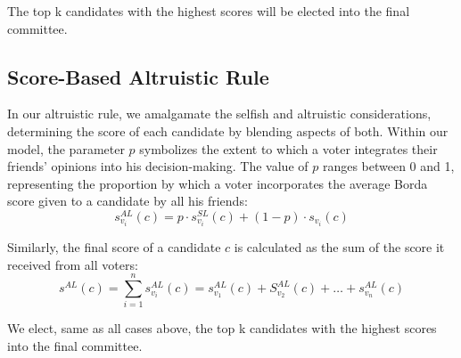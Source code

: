 \documentclass{article}
\begin{document}
The top k candidates with the highest scores will be elected into the final committee.

\subsection{Score-Based Altruistic Rule}
In our altruistic rule, we amalgamate the selfish and altruistic considerations, determining the score of each candidate by blending aspects of both. Within our model, the parameter $p$ symbolizes the extent to which a voter integrates their friends' opinions into his decision-making. The value of $p$ ranges between 0 and 1, representing the proportion by which a voter incorporates the average Borda score given to a candidate by all his friends:
\begin{equation}
s_{v_i}^{AL}(c) = p \cdot s_{v_i}^{SL}(c) + (1-p) \cdot s_{v_i}(c)\label{SB:EQ_singlevoter_Score}
\end{equation}



Similarly, the final score of a candidate $c$ is calculated as the sum of the score it received from all voters:
\begin{equation}
s^{AL}(c) = \sum_{i=1}^{n} s_{v_i}^{AL}(c)= s_{v_1}^{AL}(c) + S_{v_2}^{AL}(c) + \dots + s_{v_n}^{AL}(c)\label{SB:EQ_aggr_voter_Score}
\end{equation}

We elect, same as all cases above, the top k candidates with the highest scores into the final committee. 

\theoremstyle{definition}
\newtheorem{example}{Example}[section]
\end{document}
